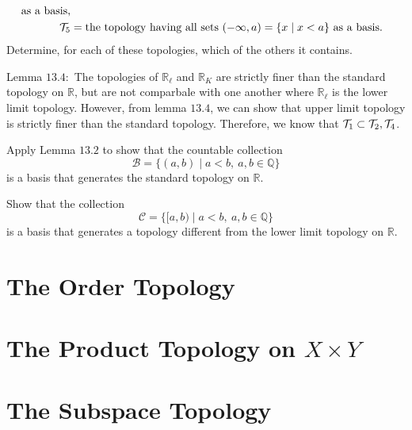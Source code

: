 \begin{exercise}
\begin{align*}
             \text{ as a basis,}\\
    \mathcal{T}_5 & = \text{the topology having all sets }
             (-\infty, a) = \{x\mid x < a\} \text{ as a basis.}
  \end{align*}
  Determine, for each of these topologies, which of the others it contains.
  \par\smallskip
  Lemma \(13.4\colon\) The topologies of \(\mathbb{R}_{\ell}\) and
  \(\mathbb{R}_K\) are strictly finer than the standard topology on
  \(\mathbb{R}\), but are not comparbale with one another where
  \(\mathbb{R}_{\ell}\) is the lower limit topology.
  However, from lemma \(13.4\), we can show that upper limit topology is
  strictly finer than the standard topology.
  Therefore, we know that \(\mathcal{T}_1\subset\mathcal{T}_2,\mathcal{T}_4\).
\item
  \begin{exercise}[label = (\alph*)]
  \item
    Apply Lemma \(13.2\) to show that the countable collection
    \[
    \mathcal{B} = \{(a, b)\mid a < b, \ a,b\in\mathbb{Q}\}
    \]
    is a basis that generates the standard topology on \(\mathbb{R}\).
  \item
    Show that the collection
    \[
    \mathcal{C} = \{[a, b)\mid a < b, \ a,b\in\mathbb{Q}\}
    \]
    is a basis that generates a topology different from the lower limit
    topology on \(\mathbb{R}\).
  \end{exercise}
\end{exercise}

\section{The Order Topology}

\section{The Product Topology on \(X\times Y\)}

\section{The Subspace Topology}

